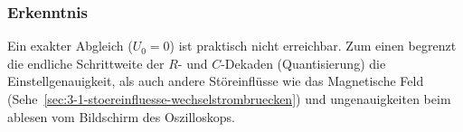 \subsubsection{Erkenntnis}
Ein exakter Abgleich ($U_0 = 0$) ist praktisch nicht erreichbar. Zum einen begrenzt die endliche Schrittweite der $R$- und $C$-Dekaden (Quantisierung) die Einstellgenauigkeit, als auch andere Störeinflüsse wie das Magnetische Feld (Sehe~\ref{sec:3-1-stoereinfluesse-wechselstrombruecken}) und ungenauigkeiten beim ablesen vom Bildschirm des Oszilloskops.
